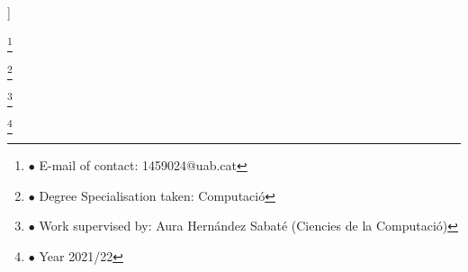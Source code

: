 ﻿\documentclass[10pt,a4paper,twocolumn,twoside]{article}
\newcommand\blfootnote[1]{%
  \begingroup
  \renewcommand\thefootnote{}\footnote{#1}%
  \addtocounter{footnote}{-1}%
  \endgroup
}
\begin{document}
\begin{@twocolumnfalse}
\begin{center}
\bigskip

{\vrule depth 0pt height 0.5pt width 4cm\hspace{7.5pt}%
%
\hspace{7.5pt}\vrule depth 0pt height 0.5pt width 4cm\relax}

\end{center}

\bigskip
\end{@twocolumnfalse}]

\blfootnote{$\bullet$ E-mail of contact: 1459024@uab.cat}
\blfootnote{$\bullet$ Degree Specialisation taken: Computació }
\blfootnote{$\bullet$ Work supervised by: Aura Hernández Sabaté (Ciencies de la Computació)}
\blfootnote{$\bullet$ Year 2021/22}
\end{document}
